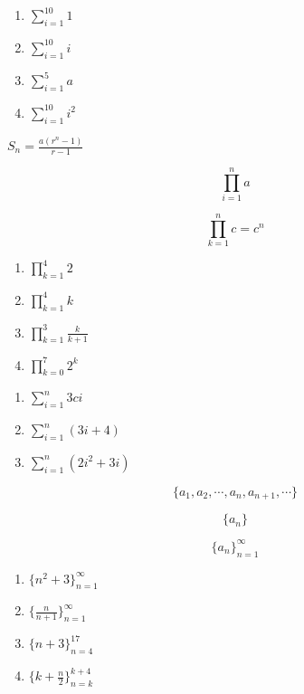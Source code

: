 \documentclass[twocolumn]{article}
\begin{document}
\begin{enumerate}
    \item $ \sum_{i=1}^{10} 1 $

    \item $ \sum_{i=1}^{10} i $

    \item $ \sum_{i=1}^{5} a $

    \item $ \sum_{i=1}^{10} i^2 $
\end{enumerate}




$ S_n = \frac{a(r^n - 1)}{r-1}$

$$ \prod_{i=1}^{n} a $$

$$ \prod_{k=1}^{n} c = c^n $$

\begin{enumerate}
    \item $ \prod_{k=1}^{4} 2 $

    \item $ \prod_{k=1}^{4} k $
    
    \item $ \prod_{k=1}^{3} \frac{k}{k+1} $

    \item $ \prod_{k=0}^{7} 2^k $
\end{enumerate}


\begin{enumerate}
    \item $ \sum_{i=1}^{n} 3ci $

    \item $ \sum_{i=1}^{n} (3i + 4) $

    \item $ \sum_{i=1}^{n} (2i^2 + 3i) $
\end{enumerate}

$$ \{a_1, a_2, \cdots, a_n, a_{n+1}, \cdots \} $$

$$ \{ a_n \} $$

$$ \{ a_n \}_{n=1}^{\infty} $$

\begin{enumerate}
    \item $ \{ n^2 + 3 \}_{n=1}^{\infty} $
    \item $ \{ \frac{n}{n+1} \}_{n=1}^{\infty} $
    \item $ \{ n + 3 \}_{n=4}^{17} $
    \item $ \{ k + \frac{n}{2} \}_{n=k}^{k+4} $
\end{enumerate}
\fi
\end{document}
